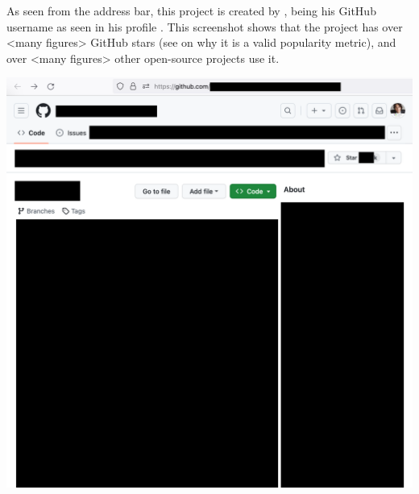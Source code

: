 
As seen from the address bar, this project is created by \MrIeeeReferenceOne,
 being his GitHub username as seen in his profile .
This screenshot shows that the project has over <many figures> GitHub stars
(see  on why it is a valid popularity metric),
and over <many figures> other open-source projects use it.

\begin{center}
    \includegraphics[width=37em]{ieee-reference-one-project-one-github-p1_public}
\end{center}
\WillContinue
\pagebreak

